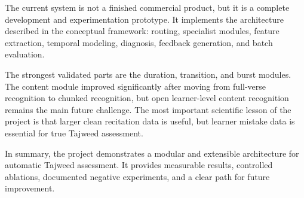\documentclass[12pt,a4paper]{report}
\begin{document}
The current system is not a finished commercial product, but it is a complete
development and experimentation prototype. It implements the architecture
described in the conceptual framework: routing, specialist modules, feature
extraction, temporal modeling, diagnosis, feedback generation, and batch
evaluation.

The strongest validated parts are the duration, transition, and burst modules.
The content module improved significantly after moving from full-verse
recognition to chunked recognition, but open learner-level content recognition
remains the main future challenge. The most important scientific lesson of the
project is that larger clean recitation data is useful, but learner mistake data
is essential for true Tajweed assessment.

In summary, the project demonstrates a modular and extensible architecture for
automatic Tajweed assessment. It provides measurable results, controlled
ablations, documented negative experiments, and a clear path for future
improvement.

\cleardoublepage
{}

\end{document}
